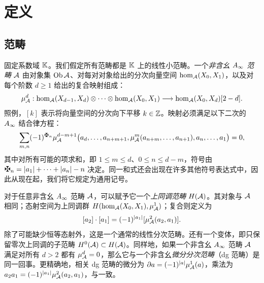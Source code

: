 \section{定义}\label{section:1}
\subsection{范畴}\label{sec:1a}
\begin{definition*}
固定系数域 $\mathbb K$。我们假定所有范畴都是 $\mathbb K$ 上的线性小范畴。一个\emph{非含幺 $A_\infty$ 范畴} $\mathcal A$ 由对象集 $\operatorname{Ob}\mathcal A$、对每对对象给出的分次向量空间 $\hom_{\mathcal A}(X_0,X_1)$，以及对每个阶数 $d\ge1$ 给出的复合映射组成：
\begin{equation}\label{eq:1.1}
\mu^d_{\mathcal A}:\hom_{\mathcal A}(X_{d-1},X_d)\otimes\cdots\otimes\hom_{\mathcal A}(X_0,X_1)\longrightarrow\hom_{\mathcal A}(X_0,X_d)[2-d].
\end{equation}
照例，$[k]$ 表示将向量空间的分次向下平移 $k\in\mathbb Z$。映射必须满足以下二次的 $A_\infty$ 结合律方程：
\begin{equation}\label{eq:1.2}
\sum_{m,n}(-1)^{\sgnmark_n}\mu^{d-m+1}_{\A}\bigl(a_d,\ldots,a_{n+m+1},\mu^m_{\A}(a_{n+m},\ldots,a_{n+1}),a_n,\ldots,a_1\bigr)=0,
\end{equation}
其中对所有可能的项求和，即 $1\le m\le d$、$0\le n\le d-m$，符号由 $\sgnmark_n=|a_1|+\cdots+|a_n|-n$ 决定。同一和式还会出现在许多其他符号表达式中，因此从现在起，我们将它规定为通用记号。
\end{definition*}

\begin{definition*}
对于任意非含幺 $A_\infty$ 范畴 $\mathcal A$，可以赋予它一个\emph{上同调范畴} $H(\mathcal A)$。其对象与 $\mathcal A$ 相同；态射空间为上同调群 $H(\hom_{\mathcal A}(X_0,X_1),\mu^1_{\mathcal A})$；复合则定义为
\begin{equation}\label{eq:1.3}
[a_2]\cdot[a_1]=(-1)^{|a_1|}[\mu^2_{\mathcal A}(a_2,a_1)].
\end{equation}
除了可能缺少恒等态射外，这是一个通常的线性分次范畴。还有一个变体，即只保留零次上同调的子范畴 $H^0(\mathcal A)\subset H(\mathcal A)$。同样地，如果一个非含幺 $A_\infty$ 范畴 $\mathcal A$ 满足对所有 $d>2$ 都有 $\mu^d_{\mathcal A}=0$，那么它与一个非含幺\emph{微分分次范畴}（dg 范畴）是同一回事。更精确地，相关 dg 范畴的微分为 $\partial a=(-1)^{|a|}\mu^1_{\mathcal A}(a)$，乘法为 $a_2a_1=(-1)^{|a_1|}\mu^2_{\mathcal A}(a_2,a_1)$，与一致。
\end{definition*}

